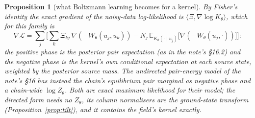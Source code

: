 \documentclass[10pt,a4paper]{article}
\newcommand{\E}{\mathbb{E}}
\theoremstyle{plain}
\newtheorem{proposition}{Proposition}
\theoremstyle{remark}
\begin{document}
\begin{proposition}[what Boltzmann learning becomes for a kernel]\label{prop:boltz}
By Fisher's identity the exact gradient of the noisy-data log-likelihood is $\langle\Xi,\nabla\log K_\theta\rangle$,
which for this family is
\[
  \nabla\mathcal L=\sum_j\Big[\sum_k\Xi_{kj}\,\nabla(-W_\theta(u_j,u_k))-N_j\,\E_{K_\theta(\cdot\mid u_j)}\!\big[\nabla(-W_\theta(u_j,\cdot))\big]\Big]:
\]
the positive phase is the posterior pair expectation (as in the note's \S16.2) and the negative
phase is the kernel's own \emph{conditional} expectation at each source state, weighted by the
posterior source mass. The undirected pair-energy model of the note's \S16 has instead the chain's
\emph{equilibrium} pair marginal as negative phase and a chain-wide $\log Z_\theta$. Both are exact
maximum likelihood for their model; the directed form needs no $Z_\theta$, its column normalisers are
the ground-state transform (Proposition~\ref{prop:tilt}), and it contains the field's kernel exactly.
\end{proposition}
\end{document}
